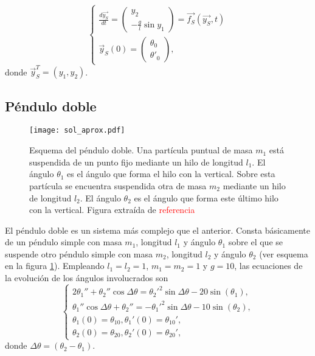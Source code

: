 \documentclass[aps,prb,twocolumn,superscriptaddress,floatfix,longbibliography]{revtex4-2}
\newif\ifptitle
\newif\ifpnumber
\newcounter{para}
\newcommand\ptitle[1]{\par\refstepcounter{para}
{\ifpnumber{\noindent\textcolor{lightgray}{\textbf{\thepara}}\indent}\fi}
{\ifptitle{\textbf{[{#1}]}}\fi}}
\begin{document}
\begin{equation}
  \left\{\begin{matrix}
  \frac{d\vec{y_S}}{dt}  = 
  \begin{pmatrix}
   y_2 \\ -\frac{g}{l} \sin{y_1}
  \end{pmatrix}
  = \vec{f_S}(\vec{y_S},t) 
  \\
  \vec{y}_S(0) = 
  \begin{pmatrix}
    \theta_0 \\ \theta'_0
   \end{pmatrix},
  \end{matrix}\right.
  \label{eq:pendulo_simple_vec}
\end{equation}
donde $\vec{y}_S^T = (y_1, y_2)$.


\subsection{Péndulo doble}

\ptitle{Presentar ecuaciones de la dinámica}

\begin{figure}[h]
  \texttt{[image: sol\_aprox.pdf]}
  \caption{Esquema del péndulo doble. Una partícula puntual de masa $m_1$ está suspendida de un punto fijo mediante un hilo de longitud $l_1$. El ángulo $\theta_1$ es el ángulo que forma el hilo con la vertical. Sobre esta partícula se encuentra suspendida otra de masa $m_2$ mediante un hilo de longitud $l_2$. El ángulo $\theta_2$ es el ángulo que forma este último hilo con la vertical. Figura extraída de \textcolor{red}{referencia}}
   \label{fig:doble_esquema}
\end{figure}

El péndulo doble es un sistema más complejo que el anterior. Consta básicamente de un péndulo simple con masa $m_1$, longitud $l_1$ y ángulo $\theta_1$ sobre el que se suspende otro péndulo simple con masa $m_2$, longitud $l_2$ y ángulo $\theta_2$ (ver esquema en la figura \ref{fig:doble_esquema}). Empleando $l_1 = l_2 = 1$, $m_1 = m_2 = 1$ y $g = 10$, las ecuaciones de la evolución de los ángulos involucrados son
\begin{equation}
\left\{\begin{matrix}
  2 \theta_1'' + \theta_2'' \cos{\Delta \theta} = \theta_2'^2 \sin{\Delta \theta} - 20 \sin{(\theta_1)}, \\
  \theta_1'' \cos{\Delta \theta} + \theta_2'' = - \theta_1'^2 \sin{\Delta \theta} - 10 \sin{(\theta_2)}, \\
  \theta_1(0) = \theta_{1 0}, \theta_1'(0) = \theta_{1 0}', \\
  \theta_2(0) = \theta_{2 0}, \theta_2'(0) = \theta_{2 0}',
  \end{matrix}\right.
  \label{eq:pendulo_doble}
\end{equation}
donde $\Delta \theta = (\theta_2 - \theta_1)$.
\end{document}
